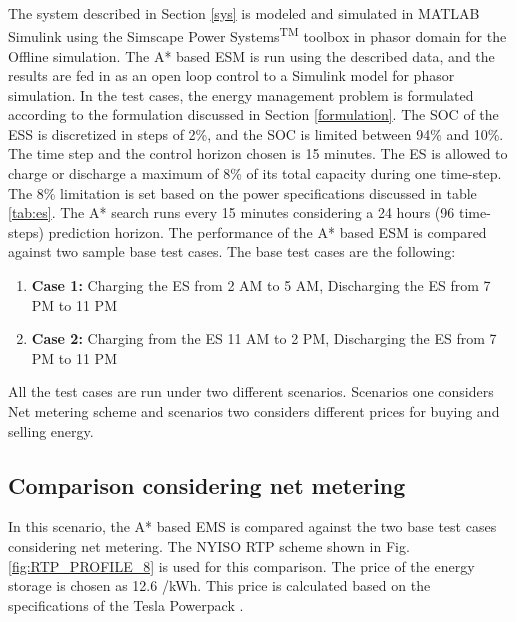 The system described in Section \ref{sys} is modeled and simulated in MATLAB\textsuperscript{\textregistered} Simulink\textsuperscript{\textregistered} using the Simscape Power Systems\textsuperscript{TM} toolbox in phasor domain for the Offline simulation. The A* based ESM is run using the described data, and the results are fed in as an open loop control to a Simulink model for phasor simulation. In the test cases, the energy management problem is formulated according to the formulation discussed in Section \ref{formulation}. The  SOC of the ESS is discretized in steps of 2\%, and the SOC is limited between  94\%  and  10\%. The time step and the control horizon chosen is 15 minutes. The ES is allowed to charge or discharge a maximum of 8\% of its total capacity during one time-step. The 8\% limitation is set based on the power specifications discussed in table \ref{tab:es}. The A* search runs every 15 minutes considering a 24 hours (96 time-steps) prediction horizon. The performance of the A* based ESM is compared against two sample base test cases. The base test cases are the following:

\begin{enumerate}
\item \textbf{Case 1:} Charging the ES from 2 AM to 5 AM, Discharging the ES from 7 PM to 11 PM

\item \textbf{Case 2:} Charging from the ES 11 AM to 2 PM, Discharging the ES from 7 PM to 11 PM
\end{enumerate}

All the test cases are run under two different scenarios. Scenarios one considers Net metering scheme and  scenarios two considers different prices for buying and selling energy.

\subsection{Comparison considering net metering} \label{netmeter}
In this scenario, the A* based EMS is compared against the two base test cases considering net metering. The NYISO RTP scheme shown in Fig. \ref{fig:RTP_PROFILE_8} is used for this comparison. The price of the energy storage is chosen as 12.6 \cent/kWh. This price is calculated based on the specifications of the Tesla Powerpack \cite{tesla_powerpack_2018}.

